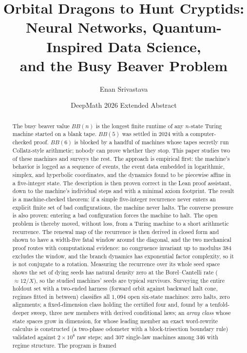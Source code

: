 \documentclass[11pt]{article}
\title{\bfseries Orbital Dragons to Hunt Cryptids:\\
Neural Networks, Quantum-Inspired Data Science,\\
and the Busy Beaver Problem}
\author{Enan Srivastava}
\date{DeepMath 2026 Extended Abstract}
\begin{document}
\maketitle

\begin{abstract}
The busy beaver value $BB(n)$ is the longest finite runtime of any
$n$-state Turing machine started on a blank tape. $BB(5)$ was settled
in 2024 with a computer-checked proof. $BB(6)$ is blocked by a handful
of machines whose tapes secretly run Collatz-style arithmetic; nobody
can prove whether they stop. This paper studies two of these
machines and surveys the rest. The approach is empirical first: the
machine's behavior is logged as a
sequence of events, the event data embedded in logarithmic, simplex, and
hyperbolic coordinates, and the dynamics found to be piecewise
affine in a five-integer state. The description is then proven
correct in the Lean proof assistant, down to the machine's individual steps and
with a minimal axiom footprint. The result is a machine-checked
theorem: if a simple five-integer recurrence never enters an explicit
finite set of bad configurations, the machine never halts. The
converse pressure is also proven: entering a bad configuration forces the
machine to halt. The open problem is thereby moved, without loss, from
a Turing machine to a short arithmetic recurrence. The renewal map of the recurrence is then derived in closed form and shown
to have a width-five fatal window around the diagonal, and the two mechanical
proof routes with computational evidence: no congruence invariant up to
modulus 384 excludes the window, and the branch dynamics has
exponential factor complexity, so it is not conjugate to a rotation.
Measuring the recurrence over its whole seed space shows the set of
dying seeds has natural density zero at the Borel--Cantelli rate
($\approx 12/X$), so the studied machines' seeds are typical
survivors.
Surveying the entire holdout set with a two-ended harness (forward
orbit against backward halt cone, regimes fitted in between)
classifies all $1{,}094$ open six-state machines: zero halts, zero
alignments; a fixed-dimension class holding the certified four and,
found by a tenfold-deeper sweep, three new members with derived
conditional laws; an \emph{array class} whose state spaces grow in
dimension, for whose leading member an exact word-rewrite calculus
is constructed (a two-phase odometer with a block-trisection boundary rule)
validated against $2 \times 10^{8}$ raw steps; and $307$ single-law
machines among $346$ with regime structure. The program is framed

\end{abstract}
\end{document}
